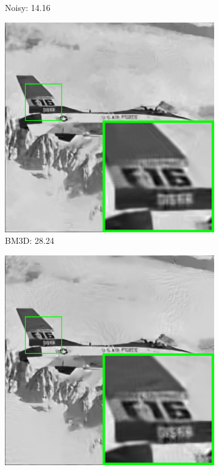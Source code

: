 \begin{figure}
\begin{subfigure}[t]{0.24\textwidth}
		\caption{Noisy: 14.16}
    \end{subfigure}
    \hfill
    \begin{subfigure}[t]{0.24\textwidth}
        \centering
        \includegraphics[width=1\textwidth]{images/pgpd/br_BM3D_50_airplane.png}
		\caption{BM3D: 28.24}
    \end{subfigure}
    \hfill
    \begin{subfigure}[t]{0.24\textwidth}
        \centering
        \includegraphics[width=1\textwidth]{images/pgpd/br_LSSC_50_airplane.png}

\end{subfigure}
\end{figure}

